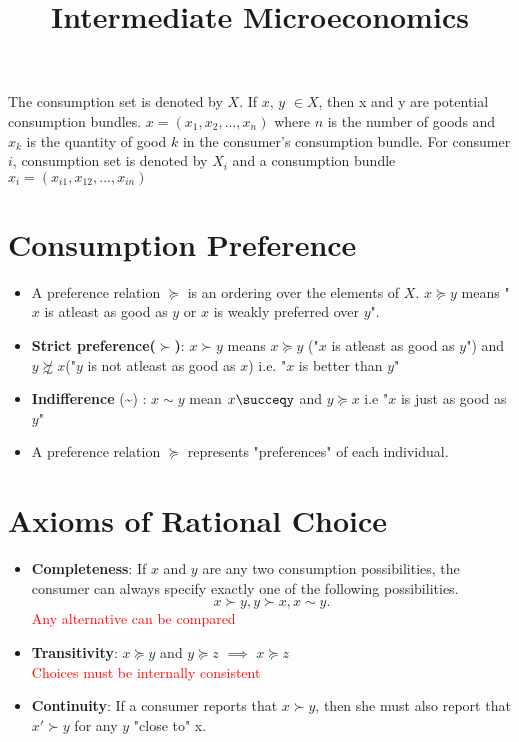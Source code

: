\documentclass{article}
\title{Intermediate Microeconomics}
\begin{document}
The consumption set is denoted by $X$.
If $x$, $y$ $\in X$, then x and y are potential consumption bundles.
$x =(x_1, x_2,...,x_n)$ where $n$ is the number of goods and $x_k$ is the quantity of good $k$ in the consumer's consumption bundle. For consumer $i$, consumption set is denoted by $X_i$ and a consumption bundle $x_i = (x_{i1}, x_{12},..., x_{in})$


\section{Consumption Preference}



\begin{itemize}

	\item A preference relation $\succeq$ is an ordering over the elements of  $X$.
 $x \succeq y$ means " $x$ is atleast as good as  $y$ or $ x$ is weakly preferred over  $y$". 
	\item \textbf{ Strict preference($\succ$)}:  $x \succ y$ means  $x \succeq y$ ("$x$ is atleast as good as  $y$") and $y \not \succsim x$("$y$ is not atleast as good as  $x$) i.e. "$x$ is better than $y$" \\
	\item \textbf{Indifference} (\sim) : $x \sim y$ mean $x\succeqy$ and  $y \succeq x$ i.e "$x$ is just as good as $y$" 
	\item A preference relation $\succeq$ represents "preferences" of each individual.

		
\end{itemize}

\section{Axioms of Rational Choice}

 \begin{itemize}
		 \item \textbf{Completeness}: If $x$ and  $y$ are any two consumption possibilities, the consumer can always specify exactly one of the following possibilities.  \[
		 x \succ y, y \succ x, x \sim y
		 .\] \textcolor{red}{Any alternative can be compared}

 \item \textbf{ Transitivity}: $x \succeq y$ and  $ y \succeq z$  $\implies$  $ x \succeq z$ 
\\ \textcolor{red}{Choices must be internally consistent}
\item \textbf{Continuity}: If a consumer reports that $x \succ y$, then she must also report that  $x' \succ y$ for any  $y$ "close to" x.
		
		
\end{itemize}
\end{document}
